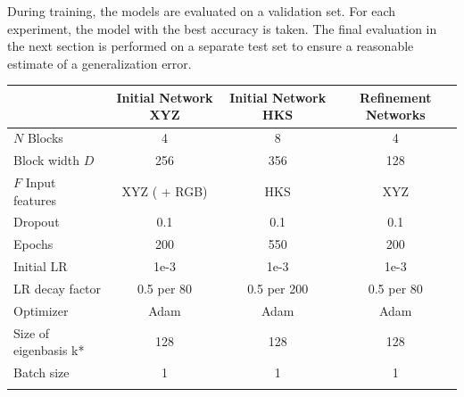 \documentclass[class=article, crop=false]{standalone}
\begin{document}
During training, the models are evaluated on a validation set. For each experiment, the model with the best accuracy is taken. The final evaluation in the next section is performed on a separate test set to ensure a reasonable estimate of a generalization error.
\begin{table}[t]

\centering
\begin{tabular}{l||c|c|c}\toprule
                & Initial Network XYZ & Initial Network HKS                                                                                               & Refinement Networks \\ \hline
$N$ Blocks         & 4                   & 8                                                                                                                 & 4                   \\
Block width $D$    & 256                 & 356                                                                                                               & 128                 \\
$F$ Input features & XYZ ( + RGB)        & HKS  & XYZ                 \\
Dropout         & 0.1                 & 0.1                                                                                                               & 0.1                 \\
Epochs          & 200                 & 550                                                                                                               & 200                 \\
Initial LR      & 1e-3                & 1e-3                                                                                                              & 1e-3                \\
LR decay factor & 0.5 per 80          & 0.5 per 200                                                                                                       & 0.5 per 80          \\
Optimizer       & Adam                & Adam                                                                                                              & Adam                \\
Size of eigenbasis k*      & 128                 & 128                                                                                                               & 128                 \\
Batch size      & 1                   & 1                                                                                                                 & 1                   \\
                &                     &                                                                                                                   &                  
\end{tabular}
\label{tab:configuration}
\end{table}
\end{document}
